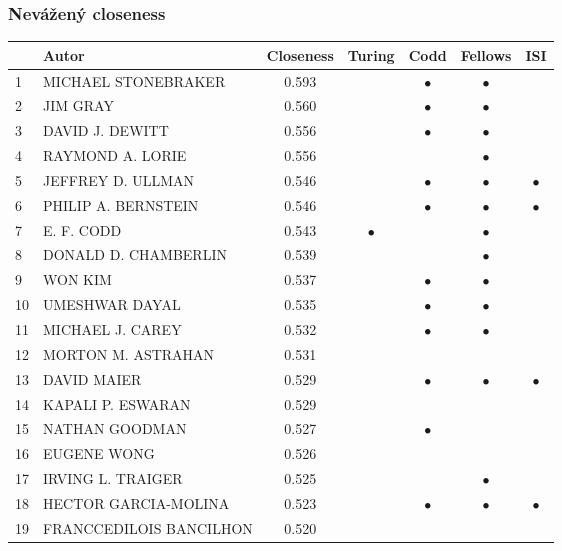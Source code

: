\documentclass[12pt,titlepage]{report}
\begin{document}
\subsubsection{Nevážený closeness}
\begin{center}
\begin{tabular}{|l|l|c|c|c|c|c|}
\hline
& {\bf Autor} & {\bf Closeness} & {\bf Turing} & {\bf Codd} & {\bf Fellows} & {\bf ISI} \\
\hline
1  & MICHAEL STONEBRAKER & 0.593& & $\bullet$ & $\bullet$ &           \\
\hline
2  & JIM GRAY & 0.560&           & $\bullet$ & $\bullet$ &           \\
\hline
3  & DAVID J. DEWITT & 0.556&           & $\bullet$ & $\bullet$ &           \\
\hline
4  & RAYMOND A. LORIE & 0.556&           &           & $\bullet$ &           \\
\hline
5  & JEFFREY D. ULLMAN & 0.546&           & $\bullet$ & $\bullet$ & $\bullet$ \\
\hline
6  & PHILIP A. BERNSTEIN & 0.546&& $\bullet$ & $\bullet$ & $\bullet$ \\
\hline
7  & E. F. CODD & 0.543& $\bullet$ &           & $\bullet$ &           \\
\hline
8  & DONALD D. CHAMBERLIN & 0.539& & & $\bullet$ &           \\
\hline
9  & WON KIM & 0.537&           & $\bullet$ & $\bullet$ &           \\
\hline
10 & UMESHWAR DAYAL & 0.535&         &$\bullet$&$\bullet$&         \\
\hline
11 & MICHAEL J. CAREY & 0.532&&$\bullet$&$\bullet$&         \\
\hline
12 & MORTON M. ASTRAHAN & 0.531&     &     &     &           \\
\hline
13 & DAVID MAIER & 0.529&         &$\bullet$&$\bullet$&$\bullet$\\
\hline
14 & KAPALI P. ESWARAN & 0.529 &    &   &     &    \\
\hline
15 & NATHAN GOODMAN & 0.527 & & $\bullet$ &         &         \\
\hline
16 & EUGENE WONG & 0.526& &  &   & \\
\hline
17 & IRVING L. TRAIGER & 0.525&           &           & $\bullet$ &           \\
\hline
18 & HECTOR GARCIA-MOLINA & 0.523 &&$\bullet$&$\bullet$&$\bullet$\\
\hline
19 & FRANCCEDILOIS BANCILHON & 0.520 &         &         &         &         \\

\end{tabular}
\end{center}
\end{document}
